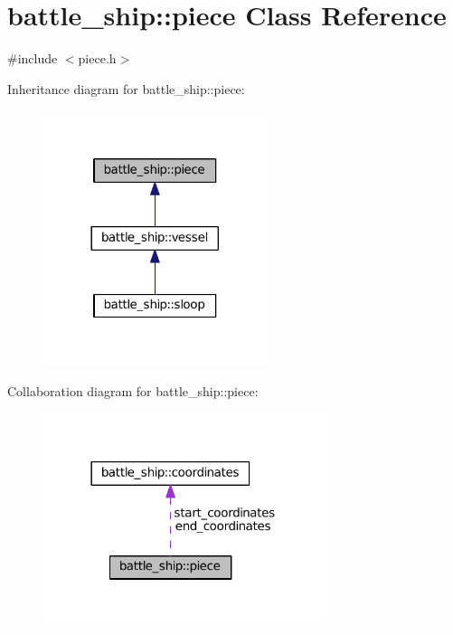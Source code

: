 \hypertarget{classbattle__ship_1_1piece}{}\section{battle\+\_\+ship\+:\+:piece Class Reference}
\label{classbattle__ship_1_1piece}


{\ttfamily \#include $<$piece.\+h$>$}



Inheritance diagram for battle\+\_\+ship\+:\+:piece\+:
\nopagebreak
\begin{figure}[H]
\begin{center}
\leavevmode
\includegraphics[width=185pt]{classbattle__ship_1_1piece__inherit__graph}
\end{center}
\end{figure}


Collaboration diagram for battle\+\_\+ship\+:\+:piece\+:
\nopagebreak
\begin{figure}[H]
\begin{center}
\leavevmode
\includegraphics[width=234pt]{classbattle__ship_1_1piece__coll__graph}
\end{center}
\end{figure}
